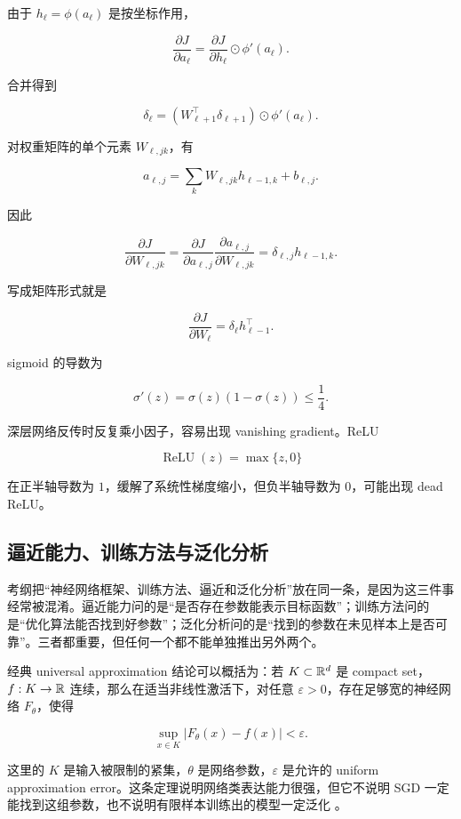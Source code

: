 由于 \(h_\ell=\phi(a_\ell)\) 是按坐标作用，

\[
  \frac{\partial J}{\partial a_\ell}
  =
  \frac{\partial J}{\partial h_\ell}
  \odot
  \phi'(a_\ell).
\]

合并得到

\[
  \delta_\ell
  =
  (W_{\ell+1}^\top\delta_{\ell+1})
  \odot
  \phi'(a_\ell).
\]

对权重矩阵的单个元素 \(W_{\ell,jk}\)，有

\[
  a_{\ell,j}
  =
  \sum_k W_{\ell,jk}h_{\ell-1,k}+b_{\ell,j}.
\]

因此

\[
  \frac{\partial J}{\partial W_{\ell,jk}}
  =
  \frac{\partial J}{\partial a_{\ell,j}}
  \frac{\partial a_{\ell,j}}{\partial W_{\ell,jk}}
  =
  \delta_{\ell,j}h_{\ell-1,k}.
\]

写成矩阵形式就是

\[
  \frac{\partial J}{\partial W_\ell}
  =
  \delta_\ell h_{\ell-1}^\top.
\]

sigmoid 的导数为

\[
  \sigma'(z)=\sigma(z)(1-\sigma(z))\le\frac14.
\]

深层网络反传时反复乘小因子，容易出现 vanishing gradient。ReLU

\[
  \operatorname{ReLU}(z)=\max\{z,0\}
\]

在正半轴导数为 \(1\)，缓解了系统性梯度缩小，但负半轴导数为 \(0\)，可能出现 dead ReLU。

\subsection{逼近能力、训练方法与泛化分析}

考纲把“神经网络框架、训练方法、逼近和泛化分析”放在同一条，是因为这三件事经常被混淆。逼近能力问的是“是否存在参数能表示目标函数”；训练方法问的是“优化算法能否找到好参数”；泛化分析问的是“找到的参数在未见样本上是否可靠”。三者都重要，但任何一个都不能单独推出另外两个。

经典 universal approximation 结论可以概括为：若 \(K\subset\mathbb{R}^d\) 是 compact set，\(f:K\to\mathbb{R}\) 连续，那么在适当非线性激活下，对任意 \(\varepsilon>0\)，存在足够宽的神经网络 \(F_\theta\)，使得

\[
  \sup_{x\in K}|F_\theta(x)-f(x)|<\varepsilon.
\]

这里的 \(K\) 是输入被限制的紧集，\(\theta\) 是网络参数，\(\varepsilon\) 是允许的 uniform approximation error。这条定理说明网络类表达能力很强，但它不说明 SGD 一定能找到这组参数，也不说明有限样本训练出的模型一定泛化 \parencite{goodfellow2016deep,bishop2023deep}。


